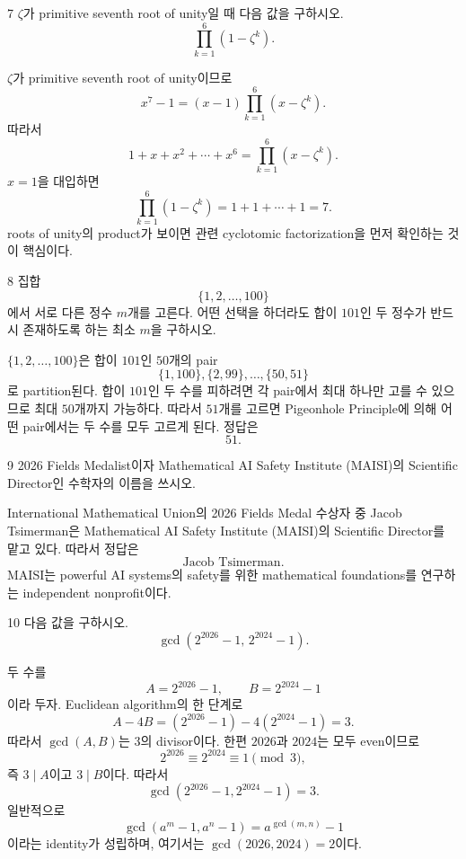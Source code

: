 \begin{problem}{7}
$\zeta$가 primitive seventh root of unity일 때 다음 값을 구하시오.
\[
    \prod_{k=1}^{6}(1-\zeta^k).
\]
\end{problem}

\begin{solution}
$\zeta$가 primitive seventh root of unity이므로
\[
    x^7-1=(x-1)\prod_{k=1}^{6}(x-\zeta^k).
\]
따라서
\[
    1+x+x^2+\cdots+x^6
    =\prod_{k=1}^{6}(x-\zeta^k).
\]
$x=1$을 대입하면
\[
    \prod_{k=1}^{6}(1-\zeta^k)
    =1+1+\cdots+1
    =\boxed{7}.
\]
roots of unity의 product가 보이면 관련 cyclotomic factorization을 먼저 확인하는 것이 핵심이다.
\end{solution}

\begin{problem}{8}
집합
\[
    \{1,2,\ldots,100\}
\]
에서 서로 다른 정수 $m$개를 고른다. 어떤 선택을 하더라도 합이 $101$인 두 정수가 반드시 존재하도록 하는 최소 $m$을 구하시오.
\end{problem}

\begin{solution}
$\{1,2,\ldots,100\}$은 합이 $101$인 $50$개의 pair
\[
    \{1,100\},\{2,99\},\ldots,\{50,51\}
\]
로 partition된다. 합이 $101$인 두 수를 피하려면 각 pair에서 최대 하나만 고를 수 있으므로 최대 $50$개까지 가능하다. 따라서 $51$개를 고르면 Pigeonhole Principle에 의해 어떤 pair에서는 두 수를 모두 고르게 된다. 정답은
\[
    \boxed{51}.
\]
\end{solution}

\begin{problem}{9}
2026 Fields Medalist이자 Mathematical AI Safety Institute (MAISI)의 Scientific Director인 수학자의 이름을 쓰시오.
\end{problem}

\begin{solution}
International Mathematical Union의 2026 Fields Medal 수상자 중 Jacob Tsimerman은 Mathematical AI Safety Institute (MAISI)의 Scientific Director를 맡고 있다. 따라서 정답은
\[
    \boxed{\text{Jacob Tsimerman}}.
\]
MAISI는 powerful AI systems의 safety를 위한 mathematical foundations를 연구하는 independent nonprofit이다.
\end{solution}

\begin{problem}{10}
다음 값을 구하시오.
\[
    \gcd\!\left(2^{2026}-1,\,2^{2024}-1\right).
\]
\end{problem}

\begin{solution}
두 수를
\[
    A=2^{2026}-1,
    \qquad
    B=2^{2024}-1
\]
이라 두자. Euclidean algorithm의 한 단계로
\[
    A-4B
    =(2^{2026}-1)-4(2^{2024}-1)
    =3.
\]
따라서 $\gcd(A,B)$는 $3$의 divisor이다. 한편 $2026$과 $2024$는 모두 even이므로
\[
    2^{2026}\equiv2^{2024}\equiv1\pmod3,
\]
즉 $3\mid A$이고 $3\mid B$이다. 따라서
\[
    \boxed{\gcd\!\left(2^{2026}-1,2^{2024}-1\right)=3}.
\]
일반적으로
\[
    \gcd(a^m-1,a^n-1)=a^{\gcd(m,n)}-1
\]
이라는 identity가 성립하며, 여기서는 $\gcd(2026,2024)=2$이다.
\end{solution}
